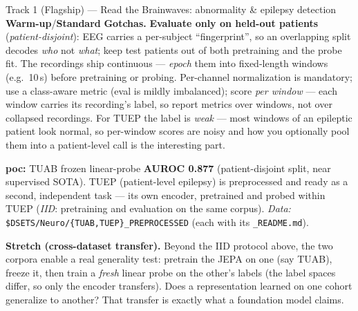 \documentclass{article}
\newcommand{\code}[1]{\texttt{\small #1}}
\newcommand{\diffeasy}{\colorbox{ebgreen!18}{\textcolor{ebgreen}{\small\bfseries Warm-up}}}
\newcommand{\diffmed}{\colorbox{ebamber!18}{\textcolor{ebamber}{\small\bfseries Standard}}}
\begin{document}
\begin{trackbox}{Track 1 (Flagship) --- Read the Brainwaves: abnormality \& epilepsy detection \hfill \diffeasy{}/\diffmed{}}
\smallskip
\textbf{Gotchas.} \textbf{Evaluate only on held-out patients} (\emph{patient-disjoint}):
EEG carries a per-subject ``fingerprint'', so an overlapping split decodes \emph{who} not
\emph{what}; keep test patients out of both pretraining and the probe fit. The recordings
ship continuous --- \emph{epoch} them into fixed-length windows (e.g.\ 10\,s) before
pretraining or probing. Per-channel normalization is mandatory; use a class-aware metric
(eval is mildly imbalanced); score \emph{per window} --- each window carries its
recording's label, so report metrics over windows, not over collapsed recordings. For
TUEP the label is \emph{weak} --- most windows of an epileptic patient look normal, so
per-window scores are noisy and how you optionally pool them into a patient-level call
is the interesting part.

\smallskip
\textbf{poc:} TUAB frozen linear-probe \textbf{AUROC 0.877} (patient-disjoint split,
near supervised SOTA). TUEP (patient-level epilepsy) is preprocessed and ready as a
second, independent task --- its own encoder, pretrained and probed within TUEP
(\emph{IID}: pretraining and evaluation on the same corpus).
\emph{Data:} \code{\$DSETS/Neuro/\{TUAB,TUEP\}\_PREPROCESSED} (each with its
\code{*\_README.md}).

\smallskip
\textbf{Stretch (cross-dataset transfer).} Beyond the IID protocol above, the two
corpora enable a real generality test: pretrain the JEPA on one (say TUAB), freeze it,
then train a \emph{fresh} linear probe on the other's labels (the label spaces differ,
so only the encoder transfers). Does a representation learned on one cohort generalize
to another? That transfer is exactly what a foundation model claims.
\end{trackbox}
\end{document}
